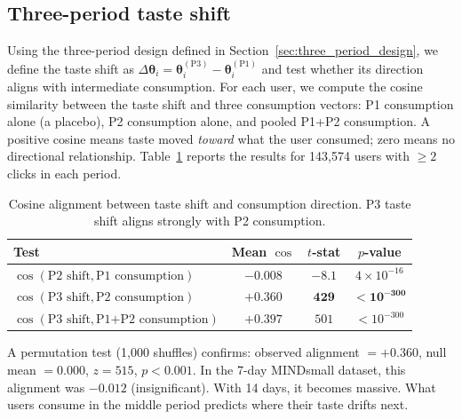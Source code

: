 \documentclass[11pt]{article}
\begin{document}
\subsection{Three-period taste shift}
\label{sec:three_period}

Using the three-period design defined in Section~\ref{sec:three_period_design}, we define the taste shift as $\Delta\boldsymbol{\theta}_i = \boldsymbol{\theta}_i^{(\text{P3})} - \boldsymbol{\theta}_i^{(\text{P1})}$ and test whether its direction aligns with intermediate consumption. For each user, we compute the cosine similarity between the taste shift and three consumption vectors: P1 consumption alone (a placebo), P2 consumption alone, and pooled P1+P2 consumption. A positive cosine means taste moved \emph{toward} what the user consumed; zero means no directional relationship. Table~\ref{tab:taste_alignment} reports the results for 143,574 users with $\geq 2$ clicks in each period.

\begin{table}[ht]
\centering
\caption{Cosine alignment between taste shift and consumption direction. P3 taste shift aligns strongly with P2 consumption.}
\label{tab:taste_alignment}
\begin{tabular}{lccc}
\toprule
Test & Mean $\cos$ & $t$-stat & $p$-value \\
\midrule
$\cos(\text{P2 shift}, \text{P1 consumption})$ & $-0.008$ & $-8.1$ & $4 \times 10^{-16}$ \\
$\cos(\text{P3 shift}, \text{P2 consumption})$ & $\boldsymbol{+0.360}$ & $\boldsymbol{429}$ & $\boldsymbol{< 10^{-300}}$ \\
$\cos(\text{P3 shift}, \text{P1{+}P2 consumption})$ & $+0.397$ & $501$ & $< 10^{-300}$ \\
\bottomrule
\end{tabular}
\end{table}
\FloatBarrier

A permutation test (1,000 shuffles) confirms: observed alignment $= +0.360$, null mean $= 0.000$, $z = 515$, $p < 0.001$. In the 7-day MINDsmall dataset, this alignment was $-0.012$ (insignificant). With 14 days, it becomes massive. What users consume in the middle period predicts where their taste drifts next.
\end{document}
